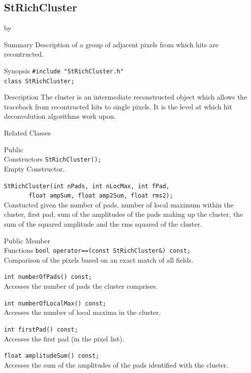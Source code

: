 \documentclass[twoside]{article}
\newcommand{\entrylabel}[1]{\mbox{\textbf{{#1}}}\hfil}%
\newenvironment{entry}
{\begin{list}{}%
    {\renewcommand{\makelabel}{\entrylabel}%
     \setlength{\labelwidth}{90pt}%
     \setlength{\leftmargin}{\labelwidth}
     \advance\leftmargin by \labelsep%
      }%
    }%
  {\end{list}}
\newcommand{\Entrylabel}[1]%
{\raisebox{0pt}[1ex][0pt]{\makebox[\labelwidth][l]%
    {\parbox[t]{\labelwidth}{\hspace{0pt}\textbf{{#1}}}}}}
\newenvironment{Entry}%
{\renewcommand{\entrylabel}{\Entrylabel}\begin{entry}}%
  {\end{entry}}
\begin{document}
\subsection{StRichCluster}
\label{sec:StRichCluster}
\begin{Entry}
\item[Summary] Description of a group of adjacent pixels from
    which hits are recontructed.
\item[Synopsis]
    \verb+#include "StRichCluster.h"+\\
    \verb+class StRichCluster;+\\
\item[Description]   The cluster is an intermediate reconstructed
    object which allows the traceback from recontructed hits to
    single pixels.  It is the level at which hit deconvolution
    algorithms work upon.
\item[Related Classes]
\item[Public\\ Constructors]
    \verb+StRichCluster();+\\
    Empty Constructor.

    \verb+StRichCluster(int nPads, int nLocMax, int fPad, +\\
    \verb+       float ampSum, float amp2Sum, float rms2);+\\
    Constucted given the number of pads, number of local maximum within
    the cluster, first pad, sum of the amplitudes of the pads making
    up the cluster, the sum of the squared amplitude and the rms
    squared of the cluster.

\item[Public Member\\ Functions]
    \verb+bool operator==(const StRichCluster&) const;+\\
    Comparison of the pixels based on an exact match of all fields.

    \verb+int numberOfPads() const;+\\
    Accesses the number of pads the cluster comprises.

    \verb+int numberOfLocalMax() const;+\\
    Accesses the number of local maxima in the cluster.

    \verb+int firstPad() const;+\\
    Accesses the first pad (in the pixel list).

    \verb+float amplitudeSum() const;+\\
    Accesses the sum of the amplitudes of the pads identified
    with the cluster.


\end{Entry}
\end{document}
